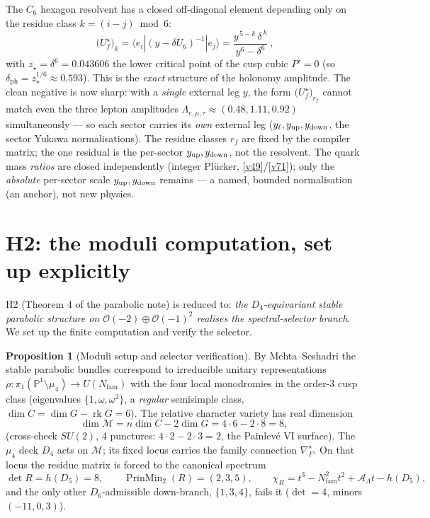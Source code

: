 \documentclass[11pt,a4paper]{article}
\newcommand{\Nfam}{N_{\mathrm{fam}}}
\newcommand{\AL}{\mathcal A_\Lambda}
\newcommand{\PP}{\mathbb{P}}
\theoremstyle{definition}
\newtheorem{proposition}{Proposition}
\begin{document}
\begin{winbox}
The $C_6$ hexagon resolvent has a closed off-diagonal element depending only on the residue class
$k=(i{-}j)\bmod 6$:
\[
  \boxed{\ \big(U_f^\star\big)_k=\langle e_i|(y-\delta U_6)^{-1}|e_j\rangle
  =\frac{y^{\,5-k}\,\delta^{\,k}}{y^{6}-\delta^{6}}\ },
\]
with $z_\star=\delta^6=0.043606$ the lower critical point of the cusp cubic $P'{=}0$ (so
$\delta_{\mathrm{ph}}=z_\star^{1/6}\approx0.593$).
This is the \emph{exact} structure of the holonomy amplitude. The clean negative is now sharp: with a
\emph{single} external leg $y$, the form $\big(U_f^\star\big)_{r_f}$ cannot match even the three lepton
amplitudes $\Lambda_{e,\mu,\tau}\approx(0.48,1.11,0.92)$ simultaneously --- so each sector carries its
\emph{own} external leg ($y_\ell,y_{\rm up},y_{\rm down}$, the sector Yukawa normalisations). The residue
classes $r_f$ are fixed by the compiler matrix; the one residual is the per-sector $y_{\rm up},y_{\rm down}$,
not the resolvent. The quark mass \emph{ratios} are closed independently (integer Pl\"ucker, \vref{v49}/\vref{v71}); only
the \emph{absolute} per-sector scale $y_{\rm up},y_{\rm down}$ remains --- a named, bounded normalisation
(an anchor), not new physics. \mO
\end{winbox}

\section{H2: the moduli computation, set up explicitly}
H2 (Theorem 4 of the parabolic note) is reduced to: \emph{the $D_4$-equivariant stable parabolic
structure on $\mathcal O(-2)\oplus\mathcal O(-1)^2$ realises the spectral-selector branch}. We set up the
finite computation and verify the selector.

\begin{proposition}[Moduli setup and selector verification]
\label{prop:h2}
By Mehta--Seshadri the stable parabolic bundles correspond to irreducible unitary representations
$\rho:\pi_1(\PP^1\setminus\mu_4)\to U(\Nfam)$ with the four local monodromies in the order-$3$ cusp class
(eigenvalues $\{1,\omega,\omega^2\}$, a \emph{regular} semisimple class, $\dim C=\dim G-\operatorname{rk}G=6$).
The relative character variety has real dimension
\[
  \dim\mathcal M=n\dim C-2\dim G=4\cdot6-2\cdot8=8 ,
\]
(cross-check $SU(2)$, $4$ punctures: $4\cdot2-2\cdot3=2$, the Painlev\'e VI surface). The $\mu_4$ deck
$D_4$ acts on $\mathcal M$; its fixed locus carries the family connection $\nabla_F^\star$. On that locus
the residue matrix is forced to the canonical spectrum
\[
  \det R=h(D_5)=8,\qquad \operatorname{PrinMin}_2(R)=(2,3,5),\qquad \chi_R=t^3-\Nfam^2t^2+\AL t-h(D_5),
\]
and the only other $D_6$-admissible down-branch, $\{1,3,4\}$, fails it ($\det=4$, minors $(-11,0,3)$).
\end{proposition}
\end{document}
